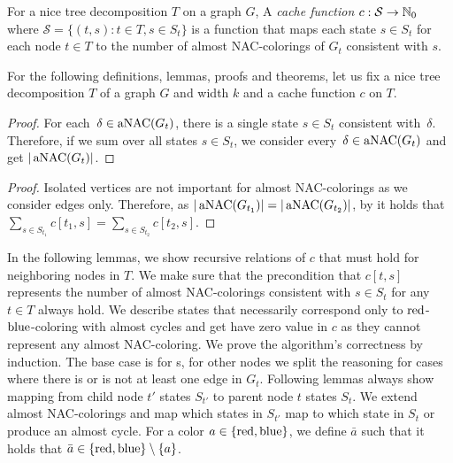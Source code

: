 %
\begin{definition}
	For a nice tree decomposition \( T \) on a graph \( G \),
	A \emph{cache function} \( c: \mathcal{S} \to \mathbb{N}_0 \)
	where \( \mathcal{S} = \{ (t,s): t \in T, s \in S_t \} \)
	is a function that maps each state \( s \in S_t \) for each node \( t \in T \)
	to the number of almost NAC-colorings of \( G_t \) consistent with \( s \).
\end{definition}
%
For the following definitions, lemmas, proofs and theorems, let us fix
a nice tree decomposition \( T \) of a graph \( G \) and width \( k \)
and a cache function \( c \) on \( T \).
%
%
\begin{proof}
	For each~\( \delta \in \operatorname{aNAC}(G_t) \),
	there is a single state \( s \in S_t \) consistent with~\( \delta \).
	Therefore, if we sum over all states \( s \in S_t \),
	we consider every~\( \delta \in \operatorname{aNAC}(G_t) \) and get \( |\operatorname{aNAC}(G_t)| \).
\end{proof}
%
%
\begin{proof}
	Isolated vertices are not important for almost NAC-colorings
	as we consider edges only.
	Therefore, as \( |\operatorname{aNAC}(G_{t_1})| = |\operatorname{aNAC}(G_{t_2})| \),
	by 
	it holds that \( \sum_{s \in S_{t_1}} c[t_1, s] = \sum_{s \in S_{t_2}} c[t_2, s] \).
\end{proof}
%

In the following lemmas, we show recursive relations of \( c \) that must hold
for neighboring nodes in \( T \).
We make sure that the precondition that \( c[t, s] \) represents the number of almost NAC-colorings
consistent with \( s \in S_t \) for any \( t \in T  \) always hold.
%
We describe states that necessarily correspond only
to \( \text{red} \)-\( \text{blue} \)-coloring with almost cycles and
get have zero value in \( c \) as they cannot represent any almost NAC-coloring.
%
We prove the algorithm's correctness by induction.
The base case is for \LeafNode{}s, for other nodes we split the reasoning for cases where
there is or is not at least one edge in \( G_t \).
%
Following lemmas always show mapping from child node \( t' \) states \( S_{t'} \)
to parent node \( t \) states \( S_t \).
We extend almost NAC-colorings and
map which states in \( S_{t'} \) map to which state in \( S_t \) or produce an almost cycle.
%
For a color \( a \in \{\text{red}, \text{blue}\} \),
we define \( \bar{a} \) such that it holds that \( \bar{a} \in \{\text{red}, \text{blue}\} \setminus \{ a \} \).

